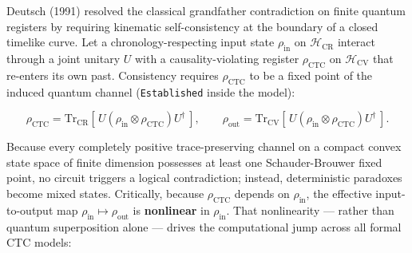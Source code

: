 \documentclass[10pt,letterpaper]{article}
\begin{document}
Deutsch (1991) resolved the classical grandfather contradiction on
finite quantum registers by requiring kinematic self-consistency at the
boundary of a closed timelike curve. Let a chronology-respecting input
state \(\rho_{\text{in}}\) on \(\mathcal{H}_{\text{CR}}\) interact
through a joint unitary \(U\) with a causality-violating register
\(\rho_{\text{CTC}}\) on \(\mathcal{H}_{\text{CV}}\) that re-enters its
own past. Consistency requires \(\rho_{\text{CTC}}\) to be a fixed point
of the induced quantum channel (\texttt{Established} inside the model):

\[\rho_{\text{CTC}} = \mathrm{Tr}_{\text{CR}}\!\left[\, U \left(\rho_{\text{in}} \otimes \rho_{\text{CTC}}\right) U^\dagger \,\right], \qquad \rho_{\text{out}} = \mathrm{Tr}_{\text{CV}}\!\left[\, U \left(\rho_{\text{in}} \otimes \rho_{\text{CTC}}\right) U^\dagger \,\right].\]

Because every completely positive trace-preserving channel on a compact
convex state space of finite dimension possesses at least one
Schauder-Brouwer fixed point, no circuit triggers a logical
contradiction; instead, deterministic paradoxes become mixed states.
Critically, because \(\rho_{\text{CTC}}\) depends on
\(\rho_{\text{in}}\), the effective input-to-output map
\(\rho_{\text{in}} \mapsto \rho_{\text{out}}\) is \textbf{nonlinear} in
\(\rho_{\text{in}}\). That nonlinearity --- rather than quantum
superposition alone --- drives the computational jump across all formal
CTC models:
\end{document}
